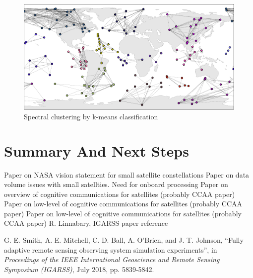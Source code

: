 \documentclass[conference]{IEEEtran}
\begin{document}
\begin{figure}[t!]
  \centerline{\includegraphics[width=\linewidth]{images/clusters.pdf}}
  \caption{Spectral clustering by k-means classification}
  \label{fig:clusters}
\end{figure}


\section{Summary And Next Steps}
\label{sec:summary}


\begin{thebibliography}{9}
{\small
{} Paper on NASA vision statement for small satellite constellations
 Paper on data volume issues with small satellties.  Need for onboard processing
 Paper on overview of cognitive communications for satellites (probably CCAA paper)
 Paper on low-level of cognitive communications for satellites (probably CCAA paper)
 Paper on low-level of cognitive communications for satellites (probably CCAA paper)
 R. Linnabary, IGARSS paper reference

 G. E. Smith, A. E. Mitchell, C. D. Ball, A. O'Brien, and J. T. Johnson, ``Fully adaptive remote sensing observing system simulation experiments'', in {\it Proceedings of the IEEE International Geoscience and Remote Sensing Symposium (IGARSS)}, July 2018, pp. 5839-5842.
}
\end{thebibliography}
\end{document}
